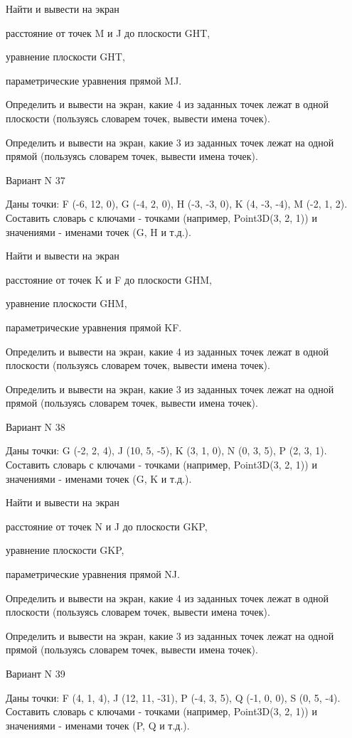 \documentclass[11pt]{report}
\begin{document}
 
Найти и вывести на экран


расстояние от точек M и J до плоскости GHT,

 
уравнение плоскости GHT,

 
параметрические уравнения прямой MJ.


Определить и вывести на экран, какие 4 из заданных точек лежат в одной плоскости (пользуясь словарем точек, вывести имена точек).


Определить и вывести на экран, какие 3 из заданных точек лежат на одной прямой (пользуясь словарем точек, вывести имена точек).

Вариант N 37

Даны точки: F (-6, 12, 0), G (-4, 2, 0), H (-3, -3, 0), K (4, -3, -4), M (-2, 1, 2).
Составить словарь с ключами - точками (например, Point3D(3, 2, 1)) и значениями - именами точек (G, H и т.д.).

 
Найти и вывести на экран


расстояние от точек K и F до плоскости GHM,

 
уравнение плоскости GHM,

 
параметрические уравнения прямой KF.


Определить и вывести на экран, какие 4 из заданных точек лежат в одной плоскости (пользуясь словарем точек, вывести имена точек).


Определить и вывести на экран, какие 3 из заданных точек лежат на одной прямой (пользуясь словарем точек, вывести имена точек).

Вариант N 38

Даны точки: G (-2, 2, 4), J (10, 5, -5), K (3, 1, 0), N (0, 3, 5), P (2, 3, 1).
Составить словарь с ключами - точками (например, Point3D(3, 2, 1)) и значениями - именами точек (G, K и т.д.).

 
Найти и вывести на экран


расстояние от точек N и J до плоскости GKP,

 
уравнение плоскости GKP,

 
параметрические уравнения прямой NJ.


Определить и вывести на экран, какие 4 из заданных точек лежат в одной плоскости (пользуясь словарем точек, вывести имена точек).


Определить и вывести на экран, какие 3 из заданных точек лежат на одной прямой (пользуясь словарем точек, вывести имена точек).

Вариант N 39

Даны точки: F (4, 1, 4), J (12, 11, -31), P (-4, 3, 5), Q (-1, 0, 0), S (0, 5, -4).
Составить словарь с ключами - точками (например, Point3D(3, 2, 1)) и значениями - именами точек (P, Q и т.д.).
\end{document}
